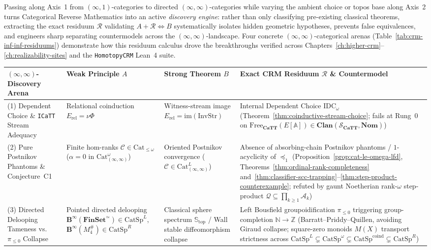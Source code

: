 \documentclass[10pt,twoside,openright]{book}
\theoremstyle{crmplain}
\theoremstyle{crmdef}
\theoremstyle{crmremark}
\begin{document}
Passing along Axis~1 from $(\infty, 1)$-categories to directed $(\infty, \infty)$-categories while varying the ambient choice or topos base along Axis~2 turns Categorical Reverse Mathematics into an active \emph{discovery engine}: rather than only classifying pre-existing classical theorems, extracting the exact residuum $\mathcal{R}$ validating $A + \mathcal{R} \iff B$ systematically isolates hidden geometric hypotheses, prevents false equivalences, and engineers sharp separating countermodels across the $(\infty, \infty)$-landscape. Four concrete $(\infty, \infty)$-categorical arenas (Table~\ref{tab:crm-inf-inf-residuums}) demonstrate how this residuum calculus drove the breakthroughs verified across Chapters~\ref{ch:higher-crm}--\ref{ch:realizability-sites} and the \texttt{HomotopyCRM} Lean~4 suite.

\begin{table}[htbp]
\centering
\scriptsize
\setlength{\tabcolsep}{2.8pt}
\renewcommand{\arraystretch}{1.12}
\begin{tabularx}{\textwidth}{@{}P{0.19\textwidth}P{0.18\textwidth}P{0.19\textwidth}Y@{}}
\toprule
\textbf{$(\infty, \infty)$-Discovery Arena} & \textbf{Weak Principle $A$} & \textbf{Strong Theorem $B$} & \textbf{Exact CRM Residuum $\mathcal{R}$ \& Countermodel} \\
\midrule
(1) Dependent Choice \& \texttt{ICaTT} Stream Adequacy & Relational coinduction $E_{\mathrm{rel}} = \nu \Phi$ & Witness-stream image $E_{\mathrm{rel}} = \mathrm{im}(\mathrm{InvStr})$ & Internal Dependent Choice $\mathrm{IDC}_\omega$ (Theorem~\ref{thm:coinductive-stream-choice}; fails at Rung~0 on $\mathrm{Free}_{\mathbf{CaTT}}(E[\mathbb{A}]) \in \mathbf{Clan}(\mathcal{S}_{\mathbf{CaTT}}, \mathbf{Nom})$) \\
(2) Pure Postnikov Phantoms \& Conjecture~C1 & Finite hom-ranks $\mathcal{C} \in \mathrm{Cat}_{\le \omega}$ ($\alpha = 0$ in $\mathrm{Cat}^\omega_{(\infty,\infty)}$) & Oriented Postnikov convergence ($\mathcal{C} \in \mathrm{Cat}^L_{(\infty,\infty)}$) & Absence of absorbing-chain Postnikov phantoms / $1$-acyclicity of $\preceq_1$ (Proposition~\ref{prop:cat-le-omega-lfd}, Theorems~\ref{thm:ordinal-rank-completeness} and~\ref{thm:classifier-scc-trapping}--\ref{thm:step-product-counterexample}; refuted by gaunt Noetherian rank-$\omega$ step-product $\mathcal{Q} \subseteq \prod_{k \ge 1} \mathcal{A}_k$) \\
(3) Directed Delooping Tameness vs.\ $\pi_{\le 0}$ Collapse & Pointed directed delooping $\mathbf{B}^\infty(\mathbf{FinSet}^{\simeq}) \in \mathrm{CatSp}^L$, $\mathbf{B}^\infty(M_4^\#) \in \mathrm{CatSp}^R$ & Classical sphere spectrum $\mathbb{S}_{\mathrm{top}}$ / Wall stable diffeomorphism collapse & Left Bousfield groupoidification $\pi_{\le 0}$ triggering group-completion $\mathbb{N} \to \mathbb{Z}$ (Barratt--Priddy--Quillen, avoiding Giraud collapse; square-zero monoids $M(X)$ transport strictness across $\mathrm{CatSp}^L \subsetneq \mathrm{CatSp}^\omega \subsetneq \mathrm{CatSp}^{\mathrm{coind}} \subsetneq \mathrm{CatSp}^R$) \\

\end{tabularx}
\end{table}
\end{document}

